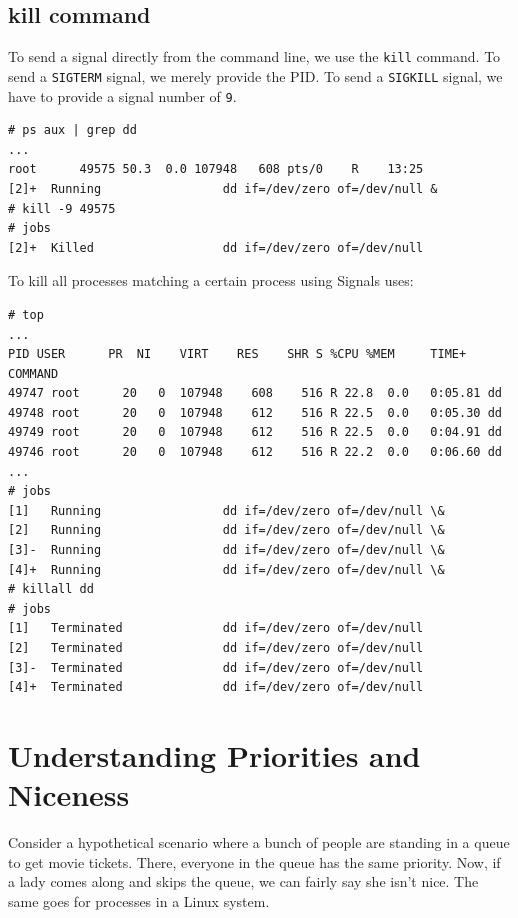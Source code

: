 \subsection{kill command}
To send a signal directly from the command line, we use the \verb|kill| command. To send a \verb|SIGTERM| signal, we merely provide the PID. To send a \verb|SIGKILL| signal, we have to provide a signal number of \verb|9|. 

\vspace{-15pt}
\begin{verbatim}
# ps aux | grep dd
...
root      49575 50.3  0.0 107948   608 pts/0    R    13:25   
[2]+  Running                 dd if=/dev/zero of=/dev/null &
# kill -9 49575
# jobs
[2]+  Killed                  dd if=/dev/zero of=/dev/null
\end{verbatim}
\vspace{-10pt}

To kill all processes matching a certain process using Signals uses:

\vspace{-15pt}
\begin{verbatim}
# top
...
PID USER      PR  NI    VIRT    RES    SHR S %CPU %MEM     TIME+ COMMAND                                                                    
49747 root      20   0  107948    608    516 R 22.8  0.0   0:05.81 dd                                                                         
49748 root      20   0  107948    612    516 R 22.5  0.0   0:05.30 dd                                                                         
49749 root      20   0  107948    612    516 R 22.5  0.0   0:04.91 dd                                                                         
49746 root      20   0  107948    612    516 R 22.2  0.0   0:06.60 dd                                                                         
...
# jobs
[1]   Running                 dd if=/dev/zero of=/dev/null \&
[2]   Running                 dd if=/dev/zero of=/dev/null \&
[3]-  Running                 dd if=/dev/zero of=/dev/null \&
[4]+  Running                 dd if=/dev/zero of=/dev/null \&
# killall dd
# jobs
[1]   Terminated              dd if=/dev/zero of=/dev/null
[2]   Terminated              dd if=/dev/zero of=/dev/null
[3]-  Terminated              dd if=/dev/zero of=/dev/null
[4]+  Terminated              dd if=/dev/zero of=/dev/null
\end{verbatim}
\vspace{-10pt}

	\section{Understanding Priorities and Niceness}
Consider a hypothetical scenario where a bunch of people are standing in a queue to get movie tickets. There, everyone in the queue has the same priority. Now, if a lady comes along and skips the queue, we can fairly say she isn't nice. The same goes for processes in a Linux system.


